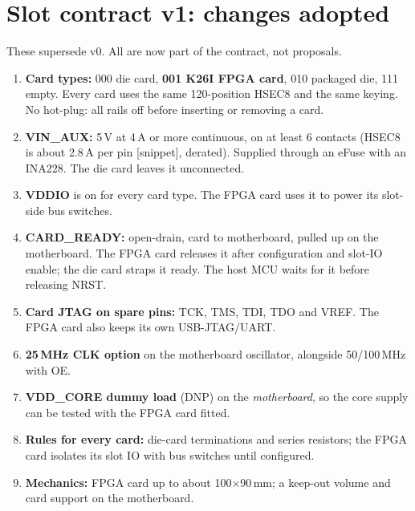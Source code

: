 \documentclass[10pt,a4paper]{article}
\newcommand\snip{\textcolor{warn}{[snippet]}}
\begin{document}
\section{Slot contract v1: changes adopted}
These supersede v0. All are now part of the contract, not proposals.
\begin{enumerate}[leftmargin=1.5em]
\item \textbf{Card types:} 000 die card, \textbf{001 K26I FPGA card}, 010 packaged die, 111 empty. Every card uses the same 120-position HSEC8 and the same keying. No hot-plug: all rails off before inserting or removing a card.
\item \textbf{VIN\_AUX:} 5\,V at 4\,A or more continuous, on at least 6 contacts (HSEC8 is about 2.8\,A per pin \snip, derated). Supplied through an eFuse with an INA228. The die card leaves it unconnected.
\item \textbf{VDDIO} is on for every card type. The FPGA card uses it to power its slot-side bus switches.
\item \textbf{CARD\_READY:} open-drain, card to motherboard, pulled up on the motherboard. The FPGA card releases it after configuration and slot-IO enable; the die card straps it ready. The host MCU waits for it before releasing NRST.
\item \textbf{Card JTAG on spare pins:} TCK, TMS, TDI, TDO and VREF. The FPGA card also keeps its own USB-JTAG/UART.
\item \textbf{25\,MHz CLK option} on the motherboard oscillator, alongside 50/100\,MHz with OE.
\item \textbf{VDD\_CORE dummy load} (DNP) on the \emph{motherboard}, so the core supply can be tested with the FPGA card fitted.
\item \textbf{Rules for every card:} die-card terminations and series resistors; the FPGA card isolates its slot IO with bus switches until configured.
\item \textbf{Mechanics:} FPGA card up to about 100$\times$90\,mm; a keep-out volume and card support on the motherboard.
\end{enumerate}
\end{document}
